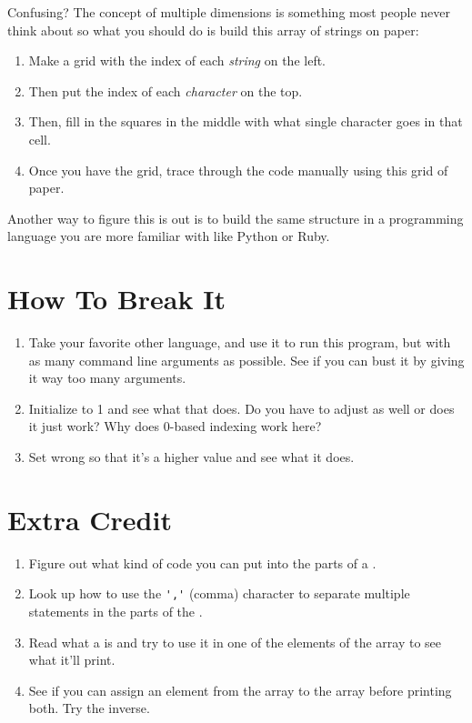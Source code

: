 Confusing? The concept of multiple dimensions is something most
people never think about so what you should do is build this
array of strings on paper:

\begin{enumerate}
\item Make a grid with the index of each \emph{string} on the left.
\item Then put the index of each \emph{character} on the top.
\item Then, fill in the squares in the middle with what single character
    goes in that cell.
\item Once you have the grid, trace through the code manually
    using this grid of paper.
\end{enumerate}

Another way to figure this is out is to build the same structure
in a programming language you are more familiar with like Python or
Ruby.

\section{How To Break It}

\begin{enumerate}
\item Take your favorite other language, and use it to run this program, but
    with as many command line arguments as possible.  See if you can bust it
    by giving it way too many arguments.
\item Initialize  to 1 and see what that does.  Do you have to adjust
     as well or does it just work?  Why does 0-based indexing work
    here?
\item Set  wrong so that it's a higher value and see what
    it does.
\end{enumerate}

\section{Extra Credit}

\begin{enumerate}
\item Figure out what kind of code you can put into the parts of a .
\item Look up how to use the \verb|','| (comma) character to separate multiple
    statements in the parts of the .
\item Read what a  is and try to use it in one of the elements of the
     array to see what it'll print.
\item See if you can assign an element from the  array to the
     array before printing both.  Try the inverse.
\end{enumerate}



